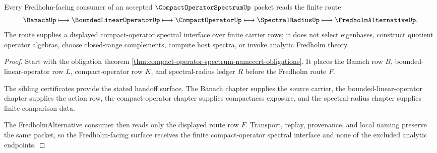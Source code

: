 \begin{theorem}
\label{thm:compact-operator-spectrum-fredholm-route}
Every Fredholm-facing consumer of an accepted $\CompactOperatorSpectrumUp$ packet reads the finite route
$$
\BanachUp \longmapsto \BoundedLinearOperatorUp \longmapsto \CompactOperatorUp \longmapsto \SpectralRadiusUp \longmapsto \FredholmAlternativeUp .
$$
The route supplies a displayed compact-operator spectral interface over finite carrier rows; it does not select eigenbases, construct quotient operator algebras, choose closed-range complements, compute host spectra, or invoke analytic Fredholm theory.
\end{theorem}
\begin{proof}
Start with the obligation theorem \autoref{thm:compact-operator-spectrum-namecert-obligations}. It places the Banach row $B$, bounded-linear-operator row $L$, compact-operator row $K$, and spectral-radius ledger $R$ before the Fredholm route $F$.

The sibling certificates provide the stated handoff surface. The Banach chapter supplies the source carrier, the bounded-linear-operator chapter supplies the action row, the compact-operator chapter supplies compactness exposure, and the spectral-radius chapter supplies finite comparison data.

The FredholmAlternative consumer then reads only the displayed route row $F$. Transport, replay, provenance, and local naming preserve the same packet, so the Fredholm-facing surface receives the finite compact-operator spectral interface and none of the excluded analytic endpoints.
\end{proof}




